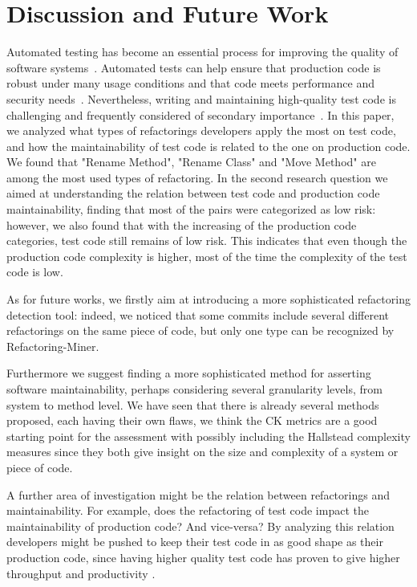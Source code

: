 \section{Discussion and Future Work}
\label{sec:futurework}
Automated testing has become an essential process for improving the quality of software systems~\cite{Spadini2018,Bertolino2007}. Automated tests can help ensure that production code is robust under many usage conditions and that code meets performance and security needs~\cite{Spadini2018,Bertolino2007}. Nevertheless, writing and maintaining high-quality test code is challenging and frequently considered of secondary importance~\cite{Spadini2018,Spadini,van2001refactoring}. In this paper, we analyzed what types of refactorings developers apply the most on test code, and how the maintainability of test code is related to the one on production code. We found that "Rename Method", "Rename Class" and "Move Method" are among the most used types of refactoring. In the second research question we aimed at understanding the relation between test code and production code maintainability, finding that most of the pairs were categorized as low risk: however, we also found that with the increasing of the production code categories, test code still remains of low risk. This indicates that even though the production code complexity is higher, most of the time the complexity of the test code is low. 

As for future works, we firstly aim at introducing a more sophisticated refactoring detection tool: indeed, we noticed that some commits include several different refactorings on the same piece of code, but only one type can be recognized by Refactoring-Miner. 

Furthermore we suggest finding a more sophisticated method for asserting software maintainability, perhaps considering several granularity levels, from system to method level. We have seen that there is already several methods proposed, each having their own flaws, we think the CK metrics are a good starting point for the assessment with possibly including the Hallstead complexity measures \cite{halstead1977elements} since they both give insight on the size and complexity of a system or piece of code.

A further area of investigation might be the relation between refactorings and maintainability. For example, does the refactoring of test code impact the maintainability of production code? And vice-versa? By analyzing this relation developers might be pushed to keep their test code in as good shape as their production code, since having higher quality test code has proven to give higher throughput and productivity \cite{athanasiou2011constructing}. 